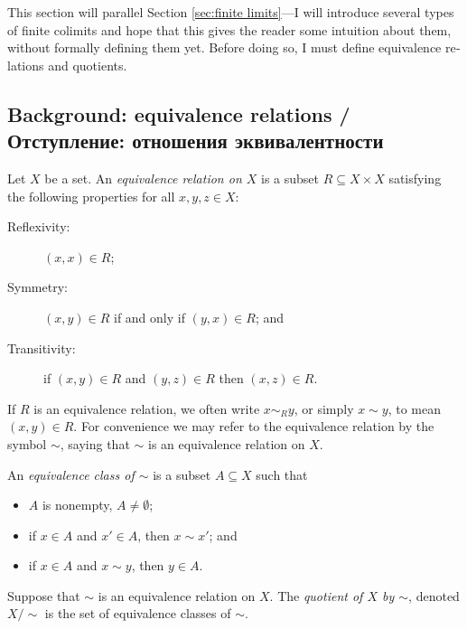 \documentclass[a4paper]{book}
\def\ss{\subseteq}
\theoremstyle{myth}
\newtheorem{definitionENG}[envENG]{\begin{english}Definition\end{english}}
\begin{document}
\begin{english}
This section will parallel Section \ref{sec:finite limits}---I will introduce several types of finite colimits and hope that this gives the reader some intuition about them, without formally defining them yet. Before doing so, I must define equivalence relations and quotients.

\begin{russian} \end{russian}


\subsection{Background: equivalence relations / Отступление: отношения эквивалентности}

\begin{definitionENG}
Let $X$ be a set. An {\em equivalence relation on $X$} is a subset $R\ss X\times X$ satisfying the following properties for all $x,y,z\in X$:
\begin{description}
\item[Reflexivity:] $(x,x)\in R$;
\item[Symmetry:] $(x,y)\in R$ if and only if $(y,x)\in R$; and
\item[Transitivity:] if $(x,y)\in R$ and $(y,z)\in R$ then $(x,z)\in R$.
\end{description}
If $R$ is an equivalence relation, we often write $x\sim_R y$, or simply $x\sim y$, to mean $(x,y)\in R$. For convenience we may refer to the equivalence relation by the symbol $\sim$, saying that $\sim$ is an equivalence relation on $X$.

An {\em equivalence class of $\sim$} is a subset $A\ss X$ such that
\begin{itemize}
\item $A$ is nonempty, $A\neq\emptyset$;
\item if $x\in A$ and $x'\in A$, then $x\sim x'$; and 
\item if $x\in A$ and $x\sim y$, then $y\in A$.
\end{itemize}
Suppose that $\sim$ is an equivalence relation on $X$. The {\em quotient of $X$ by $\sim$}, denoted $X/\sim$ is the set of equivalence classes of $\sim$.
\end{definitionENG}


\end{english}
\end{document}
